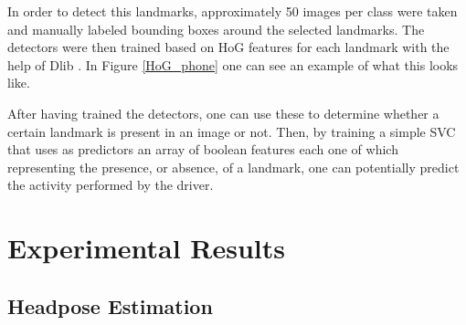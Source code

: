 \documentclass[10pt,twocolumn,letterpaper]{article}
\begin{document}
In order to detect this landmarks, approximately 50 images per class were taken and manually labeled bounding boxes around the selected landmarks. The detectors were then trained based on HoG features for each landmark with the help of Dlib \cite{dlib09}. In Figure \ref{HoG_phone} one can see an example of what this looks like.

After having trained the detectors, one can use these to determine whether a certain landmark is present in an image or not. Then, by training a simple SVC that uses as predictors an array of boolean features each one of which representing the presence, or absence, of a landmark, one can potentially predict the activity performed by the driver.



 










\section{Experimental Results}
\subsection{Headpose Estimation}
\end{document}
